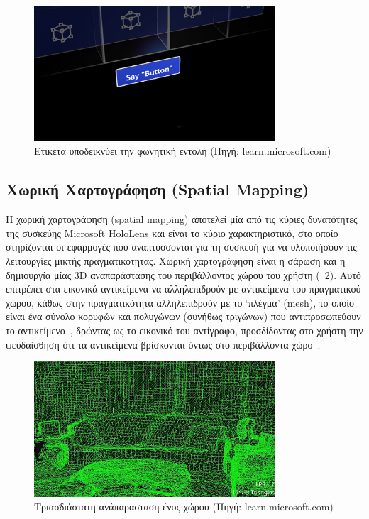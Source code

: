 \begin{enumerate}
    \begin{figure}[!ht]
        \centering
        \includegraphics[width=0.8\textwidth]{images/hololens_interaction_voice.jpg}
        \caption{Ετικέτα υποδεικνύει την φωνητική εντολή {\footnotesize (Πηγή: learn.microsoft.com)}}\label{fig:hololensInteractionVoice}
    \end{figure}
\end{enumerate}

\subsection{Χωρική Χαρτογράφηση (Spatial Mapping)}\label{subsec:hololensSpatialMapping}
Η χωρική χαρτογράφηση (spatial mapping) αποτελεί μία από τις κύριες δυνατότητες της συσκεύης Microsoft HoloLens και είναι το κύριο χαρακτηριστικό, στο οποίο στηρίζονται οι εφαρμογές που αναπτύσσονται για τη συσκευή για να υλοποιήσουν τις λειτουργίες μικτής πραγματικότητας. Χωρική χαρτογράφηση είναι η σάρωση και η δημιουργία μίας 3D αναπαράστασης του περιβάλλοντος χώρου του χρήστη (\hyperref[fig:spatialMappingExample]{\schema~\ref*{fig:spatialMappingExample}}). Αυτό επιτρέπει στα εικονικά αντικείμενα να αλληλεπιδρούν με αντικείμενα του πραγματικού χώρου, κάθως στην πραγματικότητα αλληλεπιδρούν με το `πλέγμα' (mesh), το οποίο είναι ένα σύνολο κορυφών και πολυγώνων (συνήθως τριγώνων) που αντιπροσωπεύουν το αντικείμενο~\cite{a2006_mesh}, δρώντας ως το εικονικό του αντίγραφο, προσδίδοντας στο χρήστη την ψευδαίσθηση ότι τα αντικείμενα βρίσκονται όντως στο περιβάλλοντα χώρο~\cite{mattzmsft_2023_spatial}.

\begin{figure}[!ht]
    \centering
    \includegraphics[width=0.8\textwidth]{images/spatial_mapping_example.jpg}
    \caption{Τριασδιάστατη ανάπαρασταση ένος χώρου {\footnotesize (Πηγή: learn.microsoft.com)}}\label{fig:spatialMappingExample}
\end{figure}

